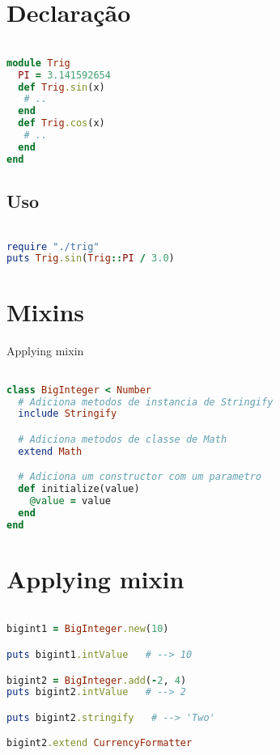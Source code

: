 \documentclass[serif,mathserif]{book}
\begin{document}
\section{Declaração}

\begin{lstlisting}[language=ruby]

module Trig
  PI = 3.141592654
  def Trig.sin(x)
   # ..
  end
  def Trig.cos(x)
   # ..
  end
end
\end{lstlisting}

\subsection{Uso}

\begin{lstlisting}[language=ruby]

require "./trig"
puts Trig.sin(Trig::PI / 3.0)
\end{lstlisting}

\section{Mixins}

Applying mixin

\begin{lstlisting}[language=ruby]

class BigInteger < Number
  # Adiciona metodos de instancia de Stringify
  include Stringify

  # Adiciona metodos de classe de Math
  extend Math

  # Adiciona um constructor com um parametro
  def initialize(value)
    @value = value
  end
end
\end{lstlisting}

\section{Applying mixin}

\begin{lstlisting}[language=ruby]

bigint1 = BigInteger.new(10)

puts bigint1.intValue   # --> 10

bigint2 = BigInteger.add(-2, 4)
puts bigint2.intValue   # --> 2

puts bigint2.stringify   # --> 'Two'

bigint2.extend CurrencyFormatter
\end{lstlisting}
\end{document}

